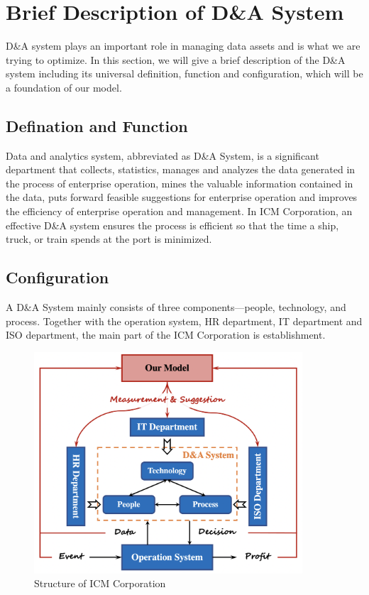\documentclass{mcmthesis}
\begin{document}
\section{Brief Description of D\&A System}
D\&A system plays an important role in managing data assets and is what we are trying to optimize. In this section, we will give a brief description of the D\&A system including its universal definition, function and configuration, which will be a foundation of our model.

\subsection{Defination and Function}
Data and analytics system, abbreviated as D\&A System, is a significant department that collects, statistics, manages and analyzes the data generated in the process of enterprise operation, mines the valuable information contained in the data, puts forward feasible suggestions for enterprise operation and improves the efficiency of enterprise operation and management. In ICM Corporation, an effective D\&A system ensures the process is efficient so that the time a ship, truck, or train spends at the port is minimized.

\subsection{Configuration}
A D\&A System mainly consists of three components—people, technology, and process. Together with the operation system, HR department, IT department and ISO department, the main part of the ICM Corporation is establishment. 

\begin{figure}[!htbp]
    \small
    \centering
    \includegraphics[width=10cm]{figures/StructureofICMCorporation.png}
    \caption{Structure of ICM Corporation} 
    \label{figure::Structure of ICM Corporation}
\end{figure}%
\end{document}
